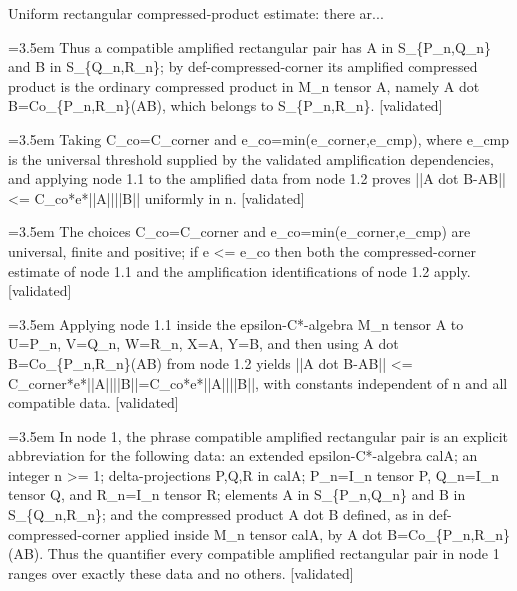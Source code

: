 \documentclass{article}
\newcommand{\step}[1]{\par\noindent\hangindent=3.5em\hangafter=1%
  \makebox[3.5em][l]{\textbf{#1.}}}
\newcommand{\steptag}[1]{\hfill{\small\textsf{[#1]}}}
\begin{document}
\begin{proofbox}{Uniform rectangular compressed-product estimate: there ar...}
\step{1.2.3} Thus a compatible amplified rectangular pair has A in S\_\{P\_n,Q\_n\} and B in S\_\{Q\_n,R\_n\}; by def-compressed-corner its amplified compressed product is the ordinary compressed product in M\_n tensor A, namely A dot B=Co\_\{P\_n,R\_n\}(AB), which belongs to S\_\{P\_n,R\_n\}. \steptag{validated} \\[4pt]
\step{1.3} Taking C\_co=C\_corner and e\_co=min(e\_corner,e\_cmp), where e\_cmp is the universal threshold supplied by the validated amplification dependencies, and applying node 1.1 to the amplified data from node 1.2 proves ||A dot B-AB|| <= C\_co*e*||A||||B|| uniformly in n. \steptag{validated} \\[6pt]
\step{1.3.1} The choices C\_co=C\_corner and e\_co=min(e\_corner,e\_cmp) are universal, finite and positive; if e <= e\_co then both the compressed-corner estimate of node 1.1 and the amplification identifications of node 1.2 apply. \steptag{validated} \\[4pt]
\step{1.3.2} Applying node 1.1 inside the epsilon-C*-algebra M\_n tensor A to U=P\_n, V=Q\_n, W=R\_n, X=A, Y=B, and then using A dot B=Co\_\{P\_n,R\_n\}(AB) from node 1.2 yields ||A dot B-AB|| <= C\_corner*e*||A||||B||=C\_co*e*||A||||B||, with constants independent of n and all compatible data. \steptag{validated} \\[4pt]
\step{1.4} In node 1, the phrase compatible amplified rectangular pair is an explicit abbreviation for the following data: an extended epsilon-C*-algebra calA; an integer n >= 1; delta-projections P,Q,R in calA; P\_n=I\_n tensor P, Q\_n=I\_n tensor Q, and R\_n=I\_n tensor R; elements A in S\_\{P\_n,Q\_n\} and B in S\_\{Q\_n,R\_n\}; and the compressed product A dot B defined, as in def-compressed-corner applied inside M\_n tensor calA, by A dot B=Co\_\{P\_n,R\_n\}(AB). Thus the quantifier every compatible amplified rectangular pair in node 1 ranges over exactly these data and no others. \steptag{validated} \\[4pt]
\end{proofbox}
\end{document}
